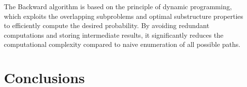 \documentclass[a4paper,11pt]{article}
\begin{document}
The Backward algorithm is based on the principle of dynamic programming, which exploits the overlapping subproblems and optimal substructure properties to efficiently compute the desired probability. By avoiding redundant computations and storing intermediate results, it significantly reduces the computational complexity compared to naive enumeration of all possible paths.

\section{Conclusions}
\label{sec:conclusions}























\end{document}
